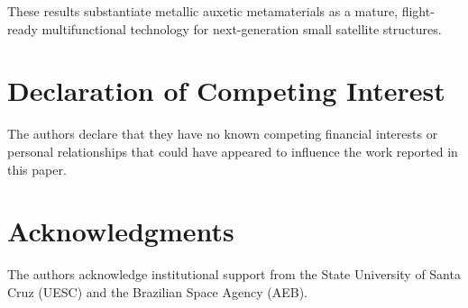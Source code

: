 \documentclass[preprint,12pt,3p]{elsarticle}
\begin{document}
These results substantiate metallic auxetic metamaterials as a mature, flight-ready multifunctional technology for next-generation small satellite structures.

\section*{Declaration of Competing Interest}
The authors declare that they have no known competing financial interests or personal relationships that could have appeared to influence the work reported in this paper.

\section*{Acknowledgments}
The authors acknowledge institutional support from the State University of Santa Cruz (UESC) and the Brazilian Space Agency (AEB).



\end{document}
